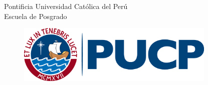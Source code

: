 \documentclass[12pt,a4paper,oneside,reqno]{book}%
\theoremstyle{definition}
\begin{document}
\thispagestyle{empty}%
\bigskip%

\begin{center}
{\baselineskip 30pt \Large Pontificia Universidad Cat\'{o}lica del Per\'{u}}\\%
{\baselineskip 30pt\large Escuela de Posgrado}%
\bigskip %
\end{center}%

\begin{figure}[htb]%
\begin{center}%
   \includegraphics[width=9.5cm]{logo2020}%
\end{center}%
\end{figure}%
\end{document}
